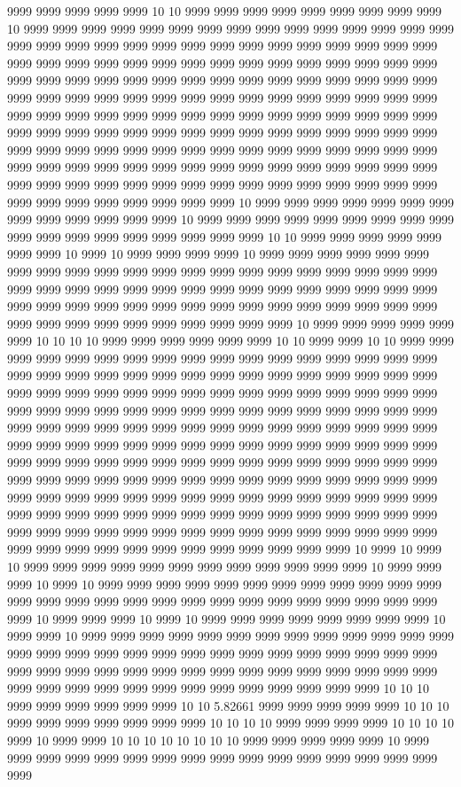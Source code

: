 9999 9999 9999 9999 9999 10 10 9999 9999 9999 9999 9999 9999 9999 9999 9999 10 9999 9999 9999 9999 9999 9999 9999 9999 9999 9999 9999 9999 9999 9999 9999 9999 9999 9999 9999 9999 9999 9999 9999 9999 9999 9999 9999 9999 9999 9999 9999 9999 9999 9999 9999 9999 9999 9999 9999 9999 9999 9999 9999 9999 9999 9999 9999 9999 9999 9999 9999 9999 9999 9999 9999 9999 9999 9999 9999 9999 9999 9999 9999 9999 9999 9999 9999 9999 9999 9999 9999 9999 9999 9999 9999 9999 9999 9999 9999 9999 9999 9999 9999 9999 9999 9999 9999 9999 9999 9999 9999 9999 9999 9999 9999 9999 9999 9999 9999 9999 9999 9999 9999 9999 9999 9999 9999 9999 9999 9999 9999 9999 9999 9999 9999 9999 9999 9999 9999 9999 9999 9999 9999 9999 9999 9999 9999 9999 9999 9999 9999 9999 9999 9999 9999 9999 9999 9999 9999 9999 9999 9999 9999 9999 9999 9999 9999 9999 9999 9999 9999 9999 9999 9999 9999 9999 9999 9999 10 9999 9999 9999 9999 9999 9999 9999 9999 9999 9999 9999 9999 9999 10 9999 9999 9999 9999 9999 9999 9999 9999 9999 9999 9999 9999 9999 9999 9999 9999 9999 9999 10 10 9999 9999 9999 9999 9999 9999 9999 10 9999 10 9999 9999 9999 9999 10 9999 9999 9999 9999 9999 9999 9999 9999 9999 9999 9999 9999 9999 9999 9999 9999 9999 9999 9999 9999 9999 9999 9999 9999 9999 9999 9999 9999 9999 9999 9999 9999 9999 9999 9999 9999 9999 9999 9999 9999 9999 9999 9999 9999 9999 9999 9999 9999 9999 9999 9999 9999 9999 9999 9999 9999 9999 9999 9999 9999 9999 10 9999 9999 9999 9999 9999 9999 10 10 10 10 9999 9999 9999 9999 9999 9999 10 10 9999 9999 10 10 9999 9999 9999 9999 9999 9999 9999 9999 9999 9999 9999 9999 9999 9999 9999 9999 9999 9999 9999 9999 9999 9999 9999 9999 9999 9999 9999 9999 9999 9999 9999 9999 9999 9999 9999 9999 9999 9999 9999 9999 9999 9999 9999 9999 9999 9999 9999 9999 9999 9999 9999 9999 9999 9999 9999 9999 9999 9999 9999 9999 9999 9999 9999 9999 9999 9999 9999 9999 9999 9999 9999 9999 9999 9999 9999 9999 9999 9999 9999 9999 9999 9999 9999 9999 9999 9999 9999 9999 9999 9999 9999 9999 9999 9999 9999 9999 9999 9999 9999 9999 9999 9999 9999 9999 9999 9999 9999 9999 9999 9999 9999 9999 9999 9999 9999 9999 9999 9999 9999 9999 9999 9999 9999 9999 9999 9999 9999 9999 9999 9999 9999 9999 9999 9999 9999 9999 9999 9999 9999 9999 9999 9999 9999 9999 9999 9999 9999 9999 9999 9999 9999 9999 9999 9999 9999 9999 9999 9999 9999 9999 9999 9999 9999 9999 9999 9999 9999 9999 9999 9999 9999 9999 9999 9999 9999 9999 9999 9999 9999 10 9999 10 9999 10 9999 9999 9999 9999 9999 9999 9999 9999 9999 9999 9999 9999 10 9999 9999 9999 10 9999 10 9999 9999 9999 9999 9999 9999 9999 9999 9999 9999 9999 9999 9999 9999 9999 9999 9999 9999 9999 9999 9999 9999 9999 9999 9999 9999 9999 9999 10 9999 9999 9999 10 9999 10 9999 9999 9999 9999 9999 9999 9999 9999 10 9999 9999 10 9999 9999 9999 9999 9999 9999 9999 9999 9999 9999 9999 9999 9999 9999 9999 9999 9999 9999 9999 9999 9999 9999 9999 9999 9999 9999 9999 9999 9999 9999 9999 9999 9999 9999 9999 9999 9999 9999 9999 9999 9999 9999 9999 9999 9999 9999 9999 9999 9999 9999 9999 9999 9999 9999 9999 9999 10 10 10 9999 9999 9999 9999 9999 9999 10 10 5.82661 9999 9999 9999 9999 9999 10 10 10 9999 9999 9999 9999 9999 9999 9999 10 10 10 10 9999 9999 9999 9999 10 10 10 10 9999 10 9999 9999 10 10 10 10 10 10 10 10 9999 9999 9999 9999 9999 10 9999 9999 9999 9999 9999 9999 9999 9999 9999 9999 9999 9999 9999 9999 9999 9999 9999 